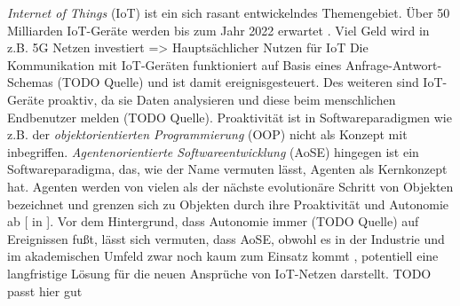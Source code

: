 \textit{Internet of Things} (IoT) ist ein sich rasant entwickelndes Themengebiet. Über 50 Milliarden IoT-Geräte werden bis zum Jahr 2022 erwartet \cite{whitepaper:iot}. 
Viel Geld wird in z.B. 5G Netzen investiert => Hauptsächlicher Nutzen für IoT
Die Kommunikation mit IoT-Geräten funktioniert auf Basis eines Anfrage-Antwort-Schemas (TODO Quelle) und ist damit ereignisgesteuert. Des weiteren sind IoT-Geräte proaktiv, da sie Daten analysieren und diese beim menschlichen Endbenutzer melden (TODO Quelle).\newline
Proaktivität ist in Softwareparadigmen wie z.B. der \textit{objektorientierten Programmierung} (OOP) nicht als Konzept mit inbegriffen.\newline
\textit{Agentenorientierte Softwareentwicklung} (AoSE) hingegen ist ein Softwareparadigma, das, wie der Name vermuten lässt, Agenten als Kernkonzept hat. Agenten werden von vielen als der nächste evolutionäre Schritt von Objekten bezeichnet \cite{article:objectsVsAgents}\cite{article:flexibleSoftware} und grenzen sich zu Objekten durch ihre Proaktivität und Autonomie ab [\cite{article:wool,book:wool2002} in \cite{book:padgham}]. Vor dem Hintergrund, dass Autonomie immer (TODO Quelle) auf Ereignissen fußt, lässt sich vermuten, dass AoSE, obwohl es in der Industrie und im akademischen Umfeld zwar noch kaum zum Einsatz kommt \cite{article:agentsWhyAndHow}, potentiell eine langfristige Lösung für die neuen Ansprüche von IoT-Netzen darstellt. TODO \cite{article:flexibleSoftware} passt hier gut